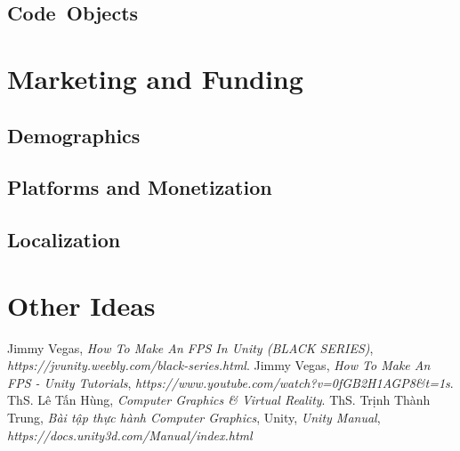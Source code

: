 \documentclass[14pt,a4paper]{extreport}
\begin{document}
\section{Code Objects}


\chapter{Marketing and Funding}
\section{Demographics}
\section{Platforms and Monetization}
\section{Localization}

\chapter{Other Ideas}

\begin{thebibliography}{widestlabel}
	 Jimmy Vegas, \textit{How To Make An FPS In Unity
	(BLACK SERIES)}, \textit{https://jvunity.weebly.com/black-series.html}.
	 Jimmy Vegas, \textit{How To Make An FPS - Unity Tutorials}, \textit{https://www.youtube.com/watch?v=0fGB2H1AGP8\&t=1s}.
	 ThS. Lê Tấn Hùng, \textit{Computer Graphics \& Virtual Reality}.
	 ThS. Trịnh Thành Trung, \textit{Bài tập thực hành Computer Graphics}, 
	 Unity, \textit{Unity Manual}, \textit{https://docs.unity3d.com/Manual/index.html}
\end{thebibliography}
\end{document}
